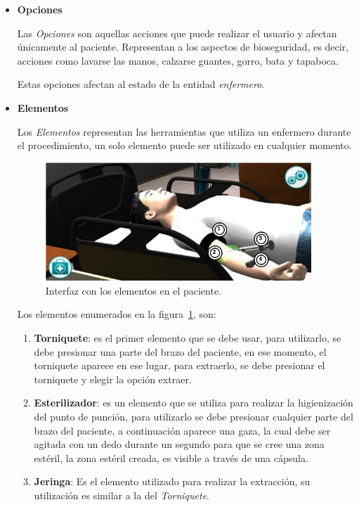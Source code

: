 \begin{itemize}
\item{\textbf{Opciones}}

Las \emph{Opciones} son aquellas acciones que puede realizar el usuario y afectan
únicamente al paciente. Representan a los aspectos de bioseguridad, es decir,
acciones como lavarse las manos, calzarse guantes, gorro, bata y tapaboca.

Estas opciones afectan al estado de la entidad \emph{enfermero}.

\item{\textbf{Elementos}}

Los \emph{Elementos} representan las herramientas que utiliza un enfermero
durante el procedimiento, un solo elemento puede ser utilizado en cualquier
momento.


\begin{figure}[H]
\centering
\includegraphics[width=10cm]{solucion/images/hemocultivo_elementos.jpg}
\caption{Interfaz con los elementos en el paciente.}
\label{fig:hemocultivo_elementos}
\end{figure}


Los elementos enumerados en la figura~\ref{fig:hemocultivo_elementos}, son:

\begin{enumerate}
\item \textbf{Torniquete}: es el primer elemento que se debe usar, para
    utilizarlo, se debe presionar una parte del brazo del
    paciente, en ese momento, el torniquete aparece en ese lugar, para
    extraerlo, se debe presionar el torniquete y elegir la opción extraer.

\item \textbf{Esterilizador}: es un elemento que se utiliza para realizar la
    higienización del punto de punción, para utilizarlo se debe presionar
    cualquier parte del brazo del paciente, a continuación aparece una gaza, la
    cual debe ser agitada con un dedo durante un segundo para que se cree una
    zona estéril, la zona estéril creada, es visible a través de una cápsula.

\item \textbf{Jeringa}: Es el elemento utilizado para realizar la extracción, su
    utilización es similar a la del \emph{Torniquete}.


\end{enumerate}
\end{itemize}
